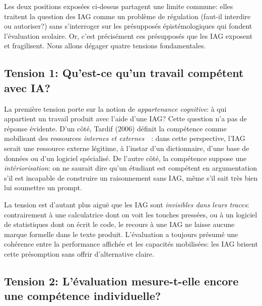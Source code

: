 

Les deux positions expos\'ees ci-dessus partagent une limite commune: elles traitent la question des IAG comme un probl\`eme de r\'egulation (faut-il interdire ou autoriser?) sans s'interroger sur les pr\'esuppos\'es \'epist\'emologiques qui fondent l'\'evaluation scolaire.
Or, c'est pr\'ecis\'ement ces pr\'esuppos\'es que les IAG exposent et fragilisent. 
Nous allons d\'egager quatre tensions fondamentales.

\subsection*{Tension 1: Qu'est-ce qu'un travail \og{}comp\'etent\fg{} avec IA?}

La premi\`ere tension porte sur la notion de \emph{appartenance cognitive}: \`a qui appartient un travail produit avec l'aide d'une IAG?\@
Cette question n'a pas de r\'eponse \'evidente.
D'un c\^ot\'e, Tardif (2006) d\'efinit la comp\'etence comme mobilisant des ressources \emph{internes et externes}~\cite{tardif2006}~: dans cette perspective, l'IAG serait une ressource externe l\'egitime, \`a l'instar d'un dictionnaire, d'une base de donn\'ees ou d'un logiciel sp\'ecialis\'e. 
De l'autre c\^ot\'e, la comp\'etence suppose une \emph{int\'eriorisation}: on ne saurait dire qu'un \'etudiant est comp\'etent en argumentation s'il est incapable de construire un raisonnement sans IAG, m\^eme s'il sait tr\`es bien lui soumettre un prompt.

La tension est d'autant plus aigu\"e que les IAG sont \emph{invisibles dans leurs traces}: contrairement \`a une calculatrice dont on voit les touches press\'ees, ou \`a un logiciel de statistiques dont on \'ecrit le code, le recours \`a une IAG ne laisse aucune marque formelle dans le texte produit. 
L'\'evaluation a toujours pr\'esum\'e une cohérence entre la performance affich\'ee et les capacit\'es mobilis\'ees: les IAG brisent cette pr\'esomption sans offrir d'alternative claire.

\subsection*{Tension 2: L'\'evaluation mesure-t-elle encore une comp\'etence individuelle?}

